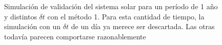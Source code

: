 \begin{figure}
{	\label{fig:ej2_m1_365_12}
	}
	\caption{
		Simulación de validación del sistema solar para un período de 1 año y distintos $\delta t$
		con el método 1.
		Para esta cantidad de tiempo, la simulación con un $\delta t$ de un día ya merece ser descartada.
		Las otras todavía parecen comportarse razonablemente
	}
	\label{ fig:res_ej2_m1_365 }
\end{figure}
